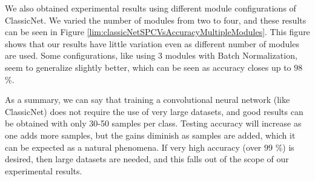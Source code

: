 We also obtained experimental results using different module configurations of ClassicNet. We varied the number of modules from two to four, and these results can be seen in Figure \ref{lim:classicNetSPCVsAccuracyMultipleModules}. This figure shows that our results have little variation even as different number of modules are used. Some configurations, like using 3 modules with Batch Normalization, seem to generalize slightly better, which can be seen as accuracy closes up to $98$ \%.

As a summary, we can say that training a convolutional neural network (like ClassicNet) does not require the use of very large datasets, and good results can be obtained with only 30-50 samples per class. Testing accuracy will increase as one adds more samples, but the gains diminish as samples are added, which it can be expected as a natural phenomena. If very high accuracy (over $99$ \%) is desired, then large datasets are needed, and this falls out of the scope of our experimental results.

